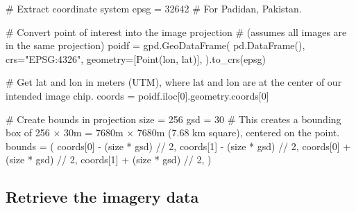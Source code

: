 \documentclass[
  letterpaper,
  DIV=11,
  numbers=noendperiod]{scrreprt}
\newenvironment{Shaded}{\begin{snugshade}}{\end{snugshade}}
\newcommand{\CommentTok}[1]{\textcolor[rgb]{0.37,0.37,0.37}{#1}}
\newcommand{\DecValTok}[1]{\textcolor[rgb]{0.68,0.00,0.00}{#1}}
\newcommand{\NormalTok}[1]{\textcolor[rgb]{0.00,0.23,0.31}{#1}}
\newcommand{\OperatorTok}[1]{\textcolor[rgb]{0.37,0.37,0.37}{#1}}
\newcommand{\StringTok}[1]{\textcolor[rgb]{0.13,0.47,0.30}{#1}}
\begin{document}
\begin{Shaded}
\begin{Highlighting}[]
\CommentTok{\# Extract coordinate system}
\NormalTok{epsg }\OperatorTok{=} \DecValTok{32642} \CommentTok{\# For Padidan, Pakistan.}

\CommentTok{\# Convert point of interest into the image projection}
\CommentTok{\# (assumes all images are in the same projection)}
\NormalTok{poidf }\OperatorTok{=}\NormalTok{ gpd.GeoDataFrame(}
\NormalTok{    pd.DataFrame(),}
\NormalTok{    crs}\OperatorTok{=}\StringTok{"EPSG:4326"}\NormalTok{,}
\NormalTok{    geometry}\OperatorTok{=}\NormalTok{[Point(lon, lat)],}
\NormalTok{).to\_crs(epsg)}

\CommentTok{\# Get lat and lon in meters (UTM), where lat and lon are at the center of our intended image chip.}
\NormalTok{coords }\OperatorTok{=}\NormalTok{ poidf.iloc[}\DecValTok{0}\NormalTok{].geometry.coords[}\DecValTok{0}\NormalTok{]}

\CommentTok{\# Create bounds in projection}
\NormalTok{size }\OperatorTok{=} \DecValTok{256}
\NormalTok{gsd }\OperatorTok{=} \DecValTok{30}
\CommentTok{\# This creates a bounding box of 256 × 30m = 7680m × 7680m (7.68 km square), centered on the point.}
\NormalTok{bounds }\OperatorTok{=}\NormalTok{ (}
\NormalTok{    coords[}\DecValTok{0}\NormalTok{] }\OperatorTok{{-}}\NormalTok{ (size }\OperatorTok{*}\NormalTok{ gsd) }\OperatorTok{//} \DecValTok{2}\NormalTok{,}
\NormalTok{    coords[}\DecValTok{1}\NormalTok{] }\OperatorTok{{-}}\NormalTok{ (size }\OperatorTok{*}\NormalTok{ gsd) }\OperatorTok{//} \DecValTok{2}\NormalTok{,}
\NormalTok{    coords[}\DecValTok{0}\NormalTok{] }\OperatorTok{+}\NormalTok{ (size }\OperatorTok{*}\NormalTok{ gsd) }\OperatorTok{//} \DecValTok{2}\NormalTok{,}
\NormalTok{    coords[}\DecValTok{1}\NormalTok{] }\OperatorTok{+}\NormalTok{ (size }\OperatorTok{*}\NormalTok{ gsd) }\OperatorTok{//} \DecValTok{2}\NormalTok{,}
\NormalTok{)}
\end{Highlighting}
\end{Shaded}

\subsection{Retrieve the imagery data}\label{retrieve-the-imagery-data}
\end{document}
